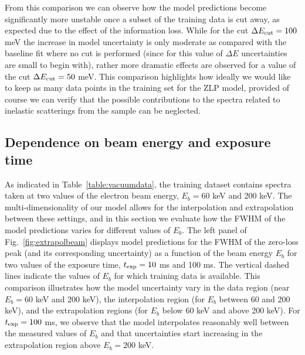 From this comparison we can observe how the model predictions become significantly more unstable
once a subset of the training data is cut away, as expected due to the effect of the information
loss.
%
While for the cut $\Delta E_{\rm cut}=100$ meV the increase in model uncertainty is only moderate
as compared with the baseline fit where no cut is performed (since for this value of $\Delta E$
uncertainties are small to begin with), rather more dramatic effects are observed
for a value of the cut $\Delta E_{\rm cut}=50$ meV.
%
This comparison highlights how ideally we would like to keep as many data points
in the training set for the ZLP model, provided of course we can verify that the
possible contributions to the spectra related to inelastic scatterings from the
sample can be neglected.

\subsection{Dependence on beam energy and exposure time }
\label{sec:depebeam}

As indicated in Table~\ref{table:vacuumdata}, the training dataset contains
spectra taken at two values of the electron beam energy, $E_b=60$ keV and 200 keV.
%
The multi-dimensionality of our model allows for the interpolation and extrapolation 
between these settings, and in this section we evaluate how the FWHM of the model predictions varies
for different values of $E_b$.
%
The left panel of Fig.~\ref{fig:extrapolbeam} displays  model predictions for the FWHM of the zero-loss peak
      (and its corresponding uncertainty) as a function of the beam energy $E_b$
      for two values of the exposure time, $t_{\rm exp}=10$ ms and 100 ms.
      The vertical dashed lines indicate the values of $E_b$ for which training data is available.
      This comparison illustrates how the model uncertainty vary in the data region
      (near $E_b=60$ keV and 200 keV), the interpolation region (for $E_b$ between 60 and 200 keV),
      and the extrapolation regions (for $E_b$ below 60 keV and above 200 keV).
      For $t_{\rm exp}=100$ ms, we observe that the model interpolates reasonably well
      between the measured values of $E_b$ and that uncertainties start increasing
      in the extrapolation region above $E_b=200$ keV.
      
